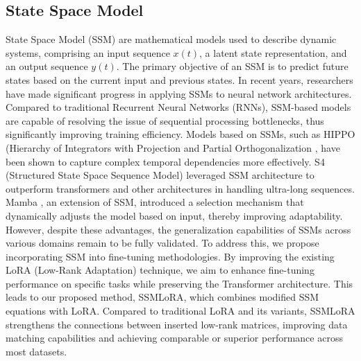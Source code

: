 \subsection{State Space Model}
State Space Model (SSM) are mathematical models used to describe dynamic systems, comprising an input sequence \( x(t) \), a latent state representation, and an output sequence \( y(t) \). The primary objective of an SSM is to predict future states based on the current input and previous states. In recent years, researchers have made significant progress in applying SSMs to neural network architectures. Compared to traditional Recurrent Neural Networks (RNNs), SSM-based models are capable of resolving the issue of sequential processing bottlenecks, thus significantly improving training efficiency. Models based on SSMs, such as HIPPO (Hierarchy of Integrators with Projection and Partial Orthogonalization \cite{hippo}, have been shown to capture complex temporal dependencies more effectively. S4 (Structured State Space Sequence Model) \cite{gu2022efficiently} leveraged SSM architecture to outperform transformers and other architectures in handling ultra-long sequences. Mamba \cite{mamba}, an extension of SSM, introduced a selection mechanism that dynamically adjusts the model based on input, thereby improving adaptability. However, despite these advantages, the generalization capabilities of SSMs across various domains remain to be fully validated. To address this, we propose incorporating SSM into fine-tuning methodologies. By improving the existing LoRA (Low-Rank Adaptation) technique, we aim to enhance fine-tuning performance on specific tasks while preserving the Transformer architecture. This leads to our proposed method, SSMLoRA, which combines modified SSM equations with LoRA. Compared to traditional LoRA and its variants, SSMLoRA strengthens the connections between inserted low-rank matrices, improving data matching capabilities and achieving comparable or superior performance across most datasets.

